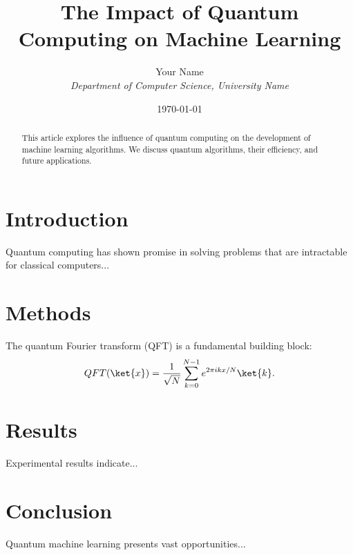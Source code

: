 \documentclass{article}
\begin{document}
\title{The Impact of Quantum Computing on Machine Learning}
\author{Your Name \\ \textit{Department of Computer Science, University Name}}
\date{\today}

\maketitle

\begin{abstract}
This article explores the influence of quantum computing on the development of machine learning algorithms. We discuss quantum algorithms, their efficiency, and future applications.
\end{abstract}

\section{Introduction}
Quantum computing has shown promise in solving problems that are intractable for classical computers...

\section{Methods}
The quantum Fourier transform (QFT) is a fundamental building block:
\begin{equation}
QFT(\ket{x}) = \frac{1}{\sqrt{N}} \sum_{k=0}^{N-1} e^{2\pi i k x / N} \ket{k}.
\end{equation}

\section{Results}
Experimental results indicate...

\section{Conclusion}
Quantum machine learning presents vast opportunities...



\end{document}
